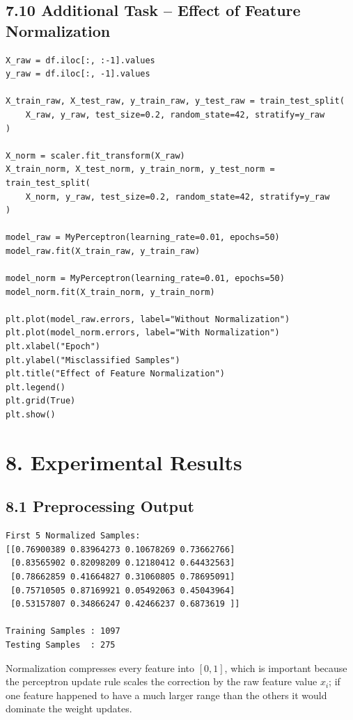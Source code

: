 \documentclass[11pt]{article}
\begin{document}
\subsection*{7.10 Additional Task -- Effect of Feature Normalization}
\begin{lstlisting}
X_raw = df.iloc[:, :-1].values
y_raw = df.iloc[:, -1].values

X_train_raw, X_test_raw, y_train_raw, y_test_raw = train_test_split(
    X_raw, y_raw, test_size=0.2, random_state=42, stratify=y_raw
)

X_norm = scaler.fit_transform(X_raw)
X_train_norm, X_test_norm, y_train_norm, y_test_norm = train_test_split(
    X_norm, y_raw, test_size=0.2, random_state=42, stratify=y_raw
)

model_raw = MyPerceptron(learning_rate=0.01, epochs=50)
model_raw.fit(X_train_raw, y_train_raw)

model_norm = MyPerceptron(learning_rate=0.01, epochs=50)
model_norm.fit(X_train_norm, y_train_norm)

plt.plot(model_raw.errors, label="Without Normalization")
plt.plot(model_norm.errors, label="With Normalization")
plt.xlabel("Epoch")
plt.ylabel("Misclassified Samples")
plt.title("Effect of Feature Normalization")
plt.legend()
plt.grid(True)
plt.show()
\end{lstlisting}

\section*{8. Experimental Results}

\subsection*{8.1 Preprocessing Output}
\begin{lstlisting}[language=bash, basicstyle=\ttfamily\scriptsize, frame=single, backgroundcolor=\color{codebg}]
First 5 Normalized Samples:
[[0.76900389 0.83964273 0.10678269 0.73662766]
 [0.83565902 0.82098209 0.12180412 0.64432563]
 [0.78662859 0.41664827 0.31060805 0.78695091]
 [0.75710505 0.87169921 0.05492063 0.45043964]
 [0.53157807 0.34866247 0.42466237 0.6873619 ]]

Training Samples : 1097
Testing Samples  : 275
\end{lstlisting}

Normalization compresses every feature into $[0,1]$, which is important because the perceptron update rule scales the correction by the raw feature value $x_i$; if one feature happened to have a much larger range than the others it would dominate the weight updates.
\end{document}
